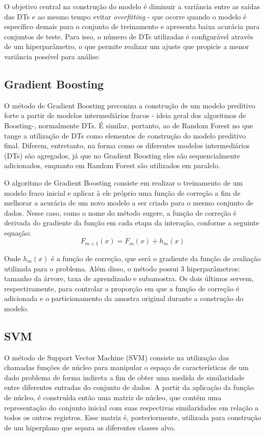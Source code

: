 \documentclass{homework}
\begin{document}
O objetivo central na construção do modelo é diminuir a variância entre as saídas das DTs e ao mesmo tempo evitar
\textit{overfitting} - que ocorre quando o modelo é específico demais para o conjunto de treinamento e apresenta baixa
acurácia para conjuntos de teste. Para isso, o número de DTs utilizadas é configurável através de um hiperparâmetro, o
que permite realizar um ajuste que propicie a menor variância possível para análise.

\subsection{Gradient Boosting}

O método de Gradient Boosting preconiza a construção de um modelo preditivo forte a partir de modelos intermediários
fracos - ideia geral dos algoritmos de Boosting-, normalmente DTs. É similar, portanto, ao de Random Forest no que tange
a utilização de DTs como elementos de construção do modelo preditivo final. Diferem, entretanto, na forma como os
diferentes modelos intermediários (DTs) são agregados, já que no Gradient Boosting eles são sequencialmente adicionados,
enquanto em Random Forest são utilizados em paralelo.

O algoritmo de Gradient Boosting consiste em realizar o treinamento de um modelo fraco inicial e aplicar à ele próprio
uma função de correção a fim de melhorar a acurácia de um novo modelo a ser criado para o mesmo conjunto de dados. Nesse
caso, como o nome do método sugere, a função de correção é derivada do gradiente da função em cada etapa da interação,
conforme a seguinte equação:
\begin{equation}
    F_{m+1}(x) = F_m(x) + h_m(x)
\end{equation}

Onde $h_m(x)$ é a função de correção, que será o gradiente da função de avaliação utilizada para o problema. Além disso,
o método possui 3 hiperparâmetros: tamanho da árvore, taxa de aprendizado e subamostra. Os dois últimos servem,
respectivamente, para controlar a proporção em que a função de correção é adicionada e o particionamento da amostra
original durante a construção do modelo.

\subsection{SVM}

O método de Support Vector Machine (SVM) consiste na utilização das chamadas funções de núcleo para manipular o espaço
de características de um dado problema de forma indireta a fim de obter uma medida de similaridade entre diferentes
entradas do conjunto de dados. A partir da aplicação da função de núcleo, é construída então uma matriz de núcleo, que
contém uma representação do conjunto inicial com suas respectivas similaridades em relação a todos os outros registros.
Esse matriz é, posteriormente, utilizada para construção de um hiperplano que separa as diferentes classes alvo.
\end{document}
